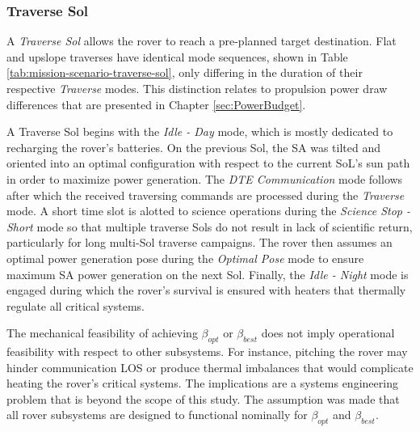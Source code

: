 \subsubsection{Traverse Sol}
\label{sec:ReferenceSols:TraverseSol}
A \textit{Traverse Sol} allows the rover to reach a pre-planned target destination. Flat and upslope traverses have identical mode sequences, shown in Table \ref{tab:mission-scenario-traverse-sol}, only differing in the duration of their respective \textit{Traverse} modes. This distinction relates to propulsion power draw differences that are presented in Chapter \ref{sec:PowerBudget}.



A Traverse Sol begins with the \textit{Idle - Day} mode, which is mostly dedicated to recharging the rover's batteries. On the previous Sol, the \ac{SA} was tilted and oriented into an optimal configuration with respect to the current SoL's sun path in order to maximize power generation. The \textit{\ac{DTE} Communication} mode follows after which the received traversing commands are processed during the \textit{Traverse} mode. A short time slot is alotted to science operations during the \textit{Science Stop - Short} mode so that multiple traverse Sols do not result in lack of scientific return, particularly for long multi-Sol traverse campaigns. The rover then assumes an optimal power generation pose during the \textit{Optimal Pose} mode to ensure maximum \ac{SA} power generation on the next Sol. Finally, the \textit{Idle - Night} mode is engaged during which the rover's survival is ensured with heaters that thermally regulate all critical systems.

The mechanical feasibility of achieving $\beta_{opt}$ or $\beta_{best}$ does not imply operational feasibility with respect to other subsystems. For instance, pitching the rover may hinder communication \ac{LOS} or produce thermal imbalances that would complicate heating the rover's critical systems. The implications are a systems engineering problem that is beyond the scope of this study. The assumption was made that all rover subsystems are designed to functional nominally for $\beta_{opt}$ and $\beta_{best}$.

%

